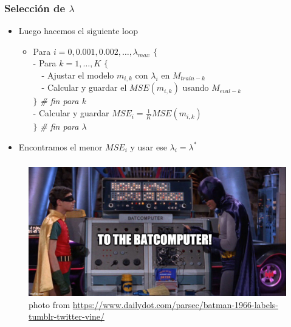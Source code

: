\documentclass[
  shownotes,
  xcolor={svgnames},
  hyperref={colorlinks,citecolor=DarkBlue,linkcolor=andesred,urlcolor=DarkBlue}
  , aspectratio=169]{beamer}
\begin{document}
\begin{frame}[fragile]
\frametitle{Selección de $\lambda$ }

  \begin{itemize}
  \item Luego hacemos el siguiente loop
      \medskip
      \begin{itemize}
          \item Para $i=0,0.001,0.002,\dots,\lambda_{max}$ $\{$ \\
          \medskip
               - Para $k=1,\dots,K$ $\{$ \\
               \medskip
               $\,\,\,\,\,\,$- Ajustar el modelo $m_{i,k}$ con $\lambda_i$ en $M_{train-k}$ \\
                     \medskip
               $\,\,\,\,\,\,$- Calcular y guardar el $MSE(m_{i,k})$ usando $M_{eval-k}$ \\
               \medskip
               $\}$ {\it \# fin para k} \\
               \medskip
               - Calcular y guardar $MSE_i=\frac{1}{K} MSE(m_{i,k})$ \\
               \medskip
          $\}$  {\it \# fin para $\lambda$}
         \medskip
      \end{itemize}
  \medskip
     \item Encontramos el menor $MSE_i$ y usar ese $\lambda_i=\lambda^*$
 
 \end{itemize}

\end{frame}
\begin{frame}[fragile]
\frametitle{}
\begin{figure}[H] \centering
  \centering
  \includegraphics[scale=0.35]{figures/baticomputer_meme.jpg}
  \\
  \tiny photo from \url{https://www.dailydot.com/parsec/batman-1966-labels-tumblr-twitter-vine/}
\end{figure}

 \end{frame}
\end{document}
